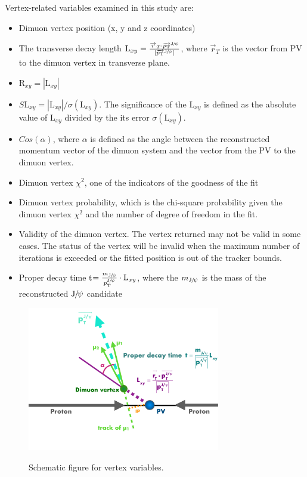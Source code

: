 Vertex-related variables examined in this study are: 
		\begin{itemize}
		\item Dimuon vertex position (x, y and z coordinates)
		\item The transverse decay length $\text{L}_{xy} = \frac{\overrightarrow{r}_{T}\cdot\overrightarrow{p_{\mathrm{T}}}^{{\mathrm{J}\hspace{-.08em}/\hspace{-.14em}\psi}}}{|\overrightarrow{p_{\mathrm{T}}}^{{\mathrm{J}\hspace{-.08em}/\hspace{-.14em}\psi}}|}$, where $\overrightarrow{r}_{T}$ is the vector from PV to the dimuon vertex in transverse plane. 
		\item $\text{R}_{xy} = |\text{L}_{xy}|$
		\item $S\text{L}_{xy} = |\text{L}_{xy}|/\sigma(\text{L}_{xy})$. The significance of the $\text{L}_{xy}$ is defined as the absolute value of $\text{L}_{xy}$ divided by the its error $\sigma(\text{L}_{xy})$. 
		\item $Cos(\alpha)$, where $\alpha$ is defined as the angle between the reconstructed momentum vector of the dimuon system and the vector from the PV to the dimuon vertex. 
		\item Dimuon vertex $\chi^{2}$, one of the indicators of the goodness of the fit
		\item Dimuon vertex probability, which is the chi-square probability given the dimuon vertex $\chi^{2}$ and the number of degree of freedom in the fit.
		\item Validity of the dimuon vertex. The vertex returned may not be valid in some cases. The status of the vertex will be invalid when the maximum number of iterations is exceeded or the fitted position is out of the tracker bounds.
		\item Proper decay time t$= \frac{m_{{\mathrm{J}\hspace{-.08em}/\hspace{-.14em}\psi}}}{p_{\mathrm{T}}^{{\mathrm{J}\hspace{-.08em}/\hspace{-.14em}\psi}}}\cdot \text{L}_{xy}$, where the $m_{{\mathrm{J}\hspace{-.08em}/\hspace{-.14em}\psi}}$ is the mass of the reconstructed ${\mathrm{J}\hspace{-.08em}/\hspace{-.14em}\psi}$ candidate
		\end{itemize}
		
		\begin{figure}[!ht]
		  \begin{center}  
		    \includegraphics[width=0.75\textwidth]{Fig/VertexVariables}\\
		    \caption{Schematic figure for vertex variables. \label{fig:BVtx}}  
		  \end{center}
		\end{figure}
		
